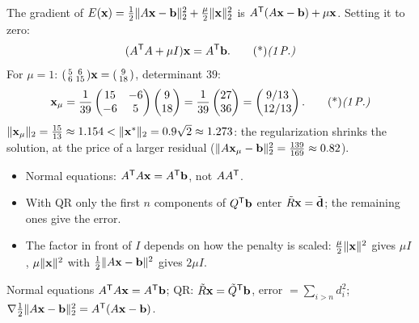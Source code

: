 \begin{solution}
 The gradient of $E(\mathbf{x})=\frac12\lVert A\mathbf{x}-\mathbf{b}\rVert_2^2+\frac\mu2\lVert \mathbf{x}\rVert_2^2$ is $A^{\mathsf{T}}(A\mathbf{x}-\mathbf{b})+\mu\mathbf{x}$. Setting it to zero:
\[
(A\T A+\mu I)\vb x=A\T\vb b.\ptd{1}
\]
For $\mu=1$: $\begin{psmallmatrix}5&6\\6&15\end{psmallmatrix}\mathbf{x}=\begin{psmallmatrix}9\\18\end{psmallmatrix}$, determinant $39$:
\[
\vb x_\mu=\frac1{39}\begin{pmatrix}15&-6\\-6&5\end{pmatrix}\begin{pmatrix}9\\18\end{pmatrix}=\frac1{39}\begin{pmatrix}27\\36\end{pmatrix}=\begin{pmatrix}9/13\\12/13\end{pmatrix}.\ptd{1}
\]
$\lVert \mathbf{x}_\mu\rVert_2=\frac{15}{13}\approx1.154<\lVert \mathbf{x}^*\rVert_2=0.9\sqrt2\approx1.273$: the regularization shrinks the solution, at the price of a larger residual ($\lVert A\mathbf{x}_\mu-\mathbf{b}\rVert_2^2=\frac{139}{169}\approx0.82$). 

\begin{trap}
\begin{itemize}
\item Normal equations: $A^{\mathsf{T}} A\mathbf{x}=A^{\mathsf{T}}\mathbf{b}$, not $AA^{\mathsf{T}}$.
\item With QR only the first $n$ components of $Q^{\mathsf{T}}\mathbf{b}$ enter $\tilde R\mathbf{x}=\tilde{\mathbf{d}}$; the remaining ones give the error.
\item The factor in front of $I$ depends on how the penalty is scaled: $\frac\mu2\lVert \mathbf{x}\rVert^2$ gives $\mu I$, $\mu\lVert \mathbf{x}\rVert^2$ with $\frac12\lVert A\mathbf{x}-\mathbf{b}\rVert^2$ gives $2\mu I$.
\end{itemize}
\end{trap}
\begin{heart}
Normal equations $A^{\mathsf{T}} A\mathbf{x}=A^{\mathsf{T}}\mathbf{b}$; QR: $\tilde R\mathbf{x}=\tilde Q^{\mathsf{T}}\mathbf{b}$, error $=\sum_{i>n}d_i^2$; $\nabla\frac12\lVert A\mathbf{x}-\mathbf{b}\rVert_2^2=A^{\mathsf{T}}(A\mathbf{x}-\mathbf{b})$.
\end{heart}
\end{solution}

